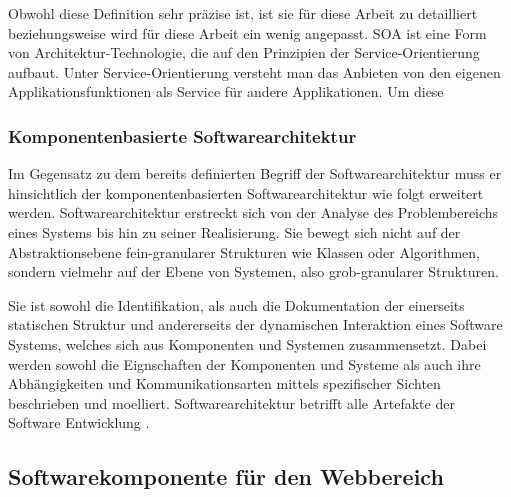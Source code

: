 Obwohl diese Definition sehr präzise ist, ist sie für diese Arbeit zu detailliert beziehungsweise wird für diese Arbeit ein wenig angepasst. SOA ist eine Form von Architektur-Technologie, die auf den Prinzipien der Service-Orientierung aufbaut. Unter Service-Orientierung versteht man das Anbieten von den eigenen Applikationsfunktionen als Service für andere Applikationen.
Um diese




\subsubsection{Komponentenbasierte Softwarearchitektur}
\label{sec:2_Komponentenbasierte_Softwarearchitektur}
Im Gegensatz zu dem bereits definierten Begriff der Softwarearchitektur muss er hinsichtlich der komponentenbasierten Softwarearchitektur wie folgt erweitert werden. Softwarearchitektur erstreckt sich von der Analyse des Problembereichs eines Systems bis hin zu seiner Realisierung. Sie bewegt sich nicht auf der Abstraktionsebene fein-granularer Strukturen wie Klassen oder Algorithmen, sondern vielmehr auf der Ebene von Systemen, also grob-granularer Strukturen.

Sie ist sowohl die Identifikation, als auch die Dokumentation der einerseits statischen Struktur und andererseits der dynamischen Interaktion eines Software Systems, welches sich aus Komponenten und Systemen zusammensetzt. Dabei werden sowohl die Eignschaften der Komponenten und Systeme als auch ihre Abhängigkeiten und Kommunikationsarten mittels spezifischer Sichten beschrieben und moelliert. Softwarearchitektur betrifft alle Artefakte der Software Entwicklung \citereset \autocite{Andresen.2003}.





\subsection{Softwarekomponente für den Webbereich}
\label{sec:2_Softwarekomponente_Web}

